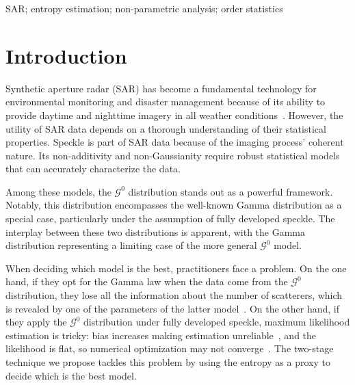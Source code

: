 \documentclass[conference,final,]{IEEEtran}
\begin{document}
\begin{IEEEkeywords}
SAR; entropy estimation; non-parametric analysis; order statistics
\end{IEEEkeywords}




\maketitle


%
\IEEEpeerreviewmaketitle


\newtheorem{lemma}{Lemma}

\newcommand{\bias}{\operatorname{Bias}}

\hypertarget{sec:Introduction}{%
\section{Introduction}\label{sec:Introduction}}

Synthetic aperture radar (SAR) has become a fundamental technology for
environmental monitoring and disaster management because of its ability
to provide daytime and nighttime imagery in all weather
conditions~\cite{Mu2019}. However, the utility of SAR data depends on a
thorough understanding of their statistical properties. Speckle is part
of SAR data because of the imaging process' coherent nature. Its
non-additivity and non-Gaussianity require robust statistical models
that can accurately characterize the data.

Among these models, the \(\mathcal{G}^0\) distribution stands out as a
powerful framework. Notably, this distribution encompasses the
well-known Gamma distribution as a special case, particularly under the
assumption of fully developed speckle. The interplay between these two
distributions is apparent, with the Gamma distribution representing a
limiting case of the more general \(\mathcal{G}^0\) model.

When deciding which model is the best, practitioners face a problem. On
the one hand, if they opt for the Gamma law when the data come from the
\(\mathcal{G}^0\) distribution, they lose all the information about the
number of scatterers, which is revealed by one of the parameters of the
latter model~\cite{Yue2021}. On the other hand, if they apply the
\(\mathcal{G}^0\) distribution under fully developed speckle, maximum
likelihood estimation is tricky: bias increases making estimation
unreliable~\cite{VasconcellosFrerySilva:CompStat}, and the likelihood is
flat, so numerical optimization may not
converge~\cite{FreryCribariSouza:JASP:04}. The two-stage technique we
propose tackles this problem by using the entropy as a proxy to decide
which is the best model.
\end{document}
